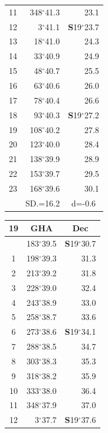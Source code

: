 \documentclass[10pt, a4paper]{report}
\begin{document}
\begin{scriptsize}
\begin{tabular*}{0.2\textwidth}[t]{@{\extracolsep{\fill}}|c|rr|}
11 & 348$^\circ$41.3 & 23.1\\[2Pt]
12 & 3$^\circ$41.1 & \textbf{S}19$^\circ$23.7\\
13 & 18$^\circ$41.0 & 24.3\\
14 & 33$^\circ$40.9 & 24.9\\
15 & 48$^\circ$40.7 & \raisebox{0.24ex}{\boldmath$\cdot$~\boldmath$\cdot$~~}25.5\\
16 & 63$^\circ$40.6 & 26.0\\
17 & 78$^\circ$40.4 & 26.6\\[2Pt]
18 & 93$^\circ$40.3 & \textbf{S}19$^\circ$27.2\\
19 & 108$^\circ$40.2 & 27.8\\
20 & 123$^\circ$40.0 & 28.4\\
21 & 138$^\circ$39.9 & \raisebox{0.24ex}{\boldmath$\cdot$~\boldmath$\cdot$~~}28.9\\
22 & 153$^\circ$39.7 & 29.5\\
23 & 168$^\circ$39.6 & 30.1\\
\hline
\rule{0pt}{2.4ex} & \multicolumn{1}{c}{SD.=16.2} & \multicolumn{1}{c|}{d=-0.6}\\
\hline
\end{tabular*}\noindent
\begin{tabular*}{0.2\textwidth}[t]{@{\extracolsep{\fill}}|c|rr|}
\hline
\multicolumn{1}{|c|}{\rule{0pt}{2.6ex}\textbf{19}} & \multicolumn{1}{c}{\textbf{GHA}} & \multicolumn{1}{c|}{\textbf{Dec}}\\
\hline\rule{0pt}{2.6ex}\noindent
0 & 183$^\circ$39.5 & \textbf{S}19$^\circ$30.7\\
1 & 198$^\circ$39.3 & 31.3\\
2 & 213$^\circ$39.2 & 31.8\\
3 & 228$^\circ$39.0 & \raisebox{0.24ex}{\boldmath$\cdot$~\boldmath$\cdot$~~}32.4\\
4 & 243$^\circ$38.9 & 33.0\\
5 & 258$^\circ$38.7 & 33.6\\[2Pt]
6 & 273$^\circ$38.6 & \textbf{S}19$^\circ$34.1\\
7 & 288$^\circ$38.5 & 34.7\\
8 & 303$^\circ$38.3 & 35.3\\
9 & 318$^\circ$38.2 & \raisebox{0.24ex}{\boldmath$\cdot$~\boldmath$\cdot$~~}35.9\\
10 & 333$^\circ$38.0 & 36.4\\
11 & 348$^\circ$37.9 & 37.0\\[2Pt]
12 & 3$^\circ$37.7 & \textbf{S}19$^\circ$37.6\\

\end{tabular*}
\end{scriptsize}
\end{document}
